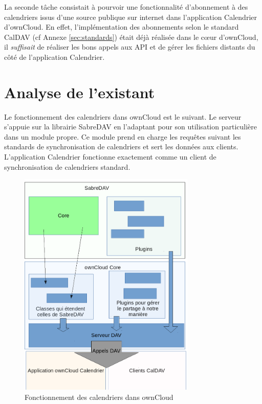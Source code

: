 \documentclass[10pt,a4paper, twoside]{report}
\begin{document}
	La seconde tâche consistait à pourvoir une fonctionnalité d'abonnement à des calendriers issus d'une source publique sur internet dans l'application Calendrier d'ownCloud. En effet, l'implémentation des abonnements selon le standard CalDAV (cf Annexe \ref{sec:standards}) était déjà réalisée dans le cœur d'ownCloud, il \textit{suffisait} de réaliser les bons appels aux API et de gérer les fichiers distants du côté de l'application Calendrier.	
	
	\chapter{Analyse de l'existant}
	
	Le fonctionnement des calendriers dans ownCloud est le suivant. Le serveur s'appuie sur la librairie SabreDAV en l'adaptant pour son utilisation particulière dans un module propre. Ce module prend en charge les requêtes suivant les standards de synchronisation de calendriers et sert les données aux clients.
	L'application Calendrier fonctionne exactement comme un client de synchronisation de calendriers standard.
	
	\begin{figure}[ht]
		\centering
		\includegraphics[width=0.75\textwidth]{images/schema.png}
		\caption*{Fonctionnement des calendriers dans ownCloud}
		\label{normal_case}
	\end{figure}
	
\end{document}
